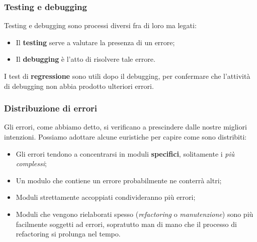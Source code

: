 \documentclass[a4paper,11pt]{article}
\begin{document}
\subsubsection{Testing e debugging}
Testing e debugging sono processi diversi fra di loro ma legati:
\begin{itemize}
	\item Il \textbf{testing} serve a valutare la presenza di un errore;
	\item Il \textbf{debugging} è l'atto di risolvere tale errore.
\end{itemize}

I test di \textbf{regressione} sono utili dopo il debugging, per confermare che l'attività di debugging non abbia prodotto ulteriori errori.

\subsubsection{Distribuzione di errori}
Gli errori, come abbiamo detto, si verificano a prescindere dalle nostre migliori intenzioni.
Possiamo adottare alcune euristiche per capire come sono distribiti:
\begin{itemize}
	\item Gli errori tendono a concentrarsi in moduli \textbf{specifici}, solitamente i \textit{più complessi};
	\item Un modulo che contiene un errore probabilmente ne conterrà altri;
	\item Moduli strettamente accoppiati condivideranno più errori;
	\item Moduli che vengono rielaborati spesso (\textit{refactoring} o \textit{manutenzione}) sono più facilmente soggetti ad errori, sopratutto man di mano che il processo di refactoring si prolunga nel tempo.
\end{itemize}
\end{document}
